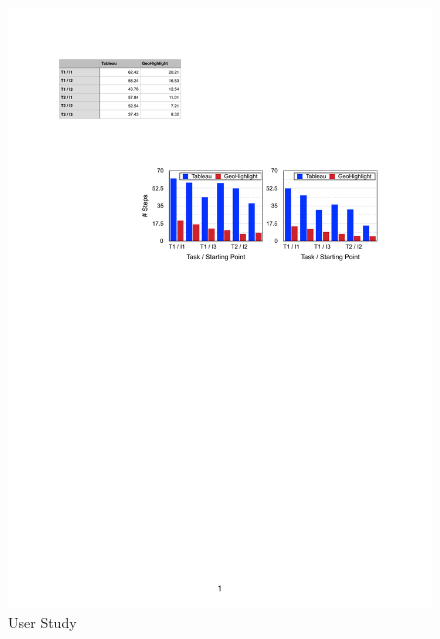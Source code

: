 \begin{figure}[t]
 \centering
 \includegraphics[width=\columnwidth]{figs/userstudy}
\caption{User Study}
\vspace{-5pt}
\label{fig:userstudy}
\end{figure}



